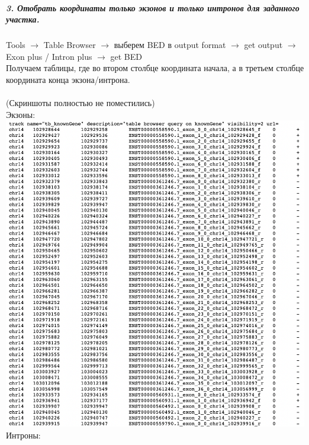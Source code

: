 \documentclass[12pt]{article}
\begin{document}
\subparagraph{3. Отобрать координаты только экзонов и только интронов для заданного участка.\\}
Tools $\rightarrow$ Table Browser $\rightarrow$ выберем BED в output format $\rightarrow$ get output $\rightarrow$ Exon plus / Intron plus $\rightarrow$ get BED\\
Получаем таблицы, где во втором столбце координата начала, а в третьем столбце координата конца экзона/интрона.\\\\
(Скриншоты полностью не поместились)\\

\newpage
Экзоны:\\
\includegraphics[width=15cm]{image/image14.png}\\
\newpage
Интроны:\\
\end{document}
